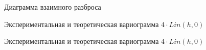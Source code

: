 \begin{figure}[H]
\caption{Диаграмма взаимного разброса}
\label{img:hscat}
\end{figure}

\begin{figure}[H]
\caption{Экспериментальная и теоретическая вариограмма $ 4 \cdot Lin(h, 0) $}
\label{img:lin-modeled}
\end{figure}

\begin{figure}[H]
\caption{Экспериментальная и теоретическая вариограмма $ 4 \cdot Lin(h, 0) $}
\label{img:lin-modeled}
\end{figure}

